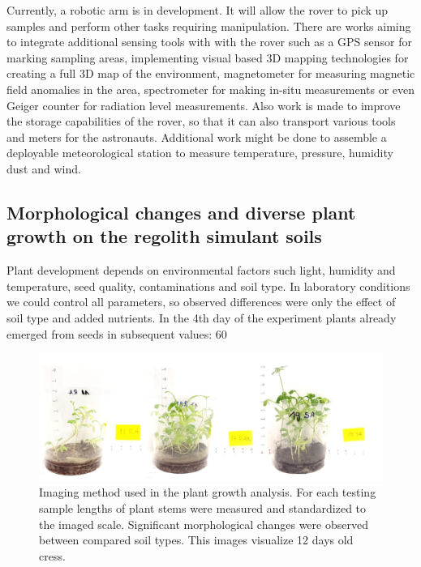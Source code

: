 \documentclass[preprint]{elsarticle}
\begin{document}
Currently, a robotic arm is in development. It will allow the rover to pick up samples and perform other tasks requiring manipulation. There are works aiming to integrate additional sensing tools with with the rover such as a GPS sensor for marking sampling areas, implementing visual based 3D mapping technologies for creating a full 3D map of the environment, magnetometer for measuring magnetic field anomalies in the area, spectrometer for making in-situ measurements or even Geiger counter for radiation level measurements. Also work is made to improve the storage capabilities of the rover, so that it can also transport various tools and meters for the astronauts. Additional work might be done to assemble a deployable meteorological station to measure temperature, pressure, humidity dust and wind.

\subsection{Morphological changes and diverse plant growth on the regolith simulant soils}
Plant development depends on environmental factors such light, humidity and temperature, seed quality, contaminations and soil type. In laboratory conditions we could control all parameters, so observed differences were only the effect of soil type and added nutrients. In the 4th day of the experiment plants already emerged from seeds in subsequent values: 60%

\begin{figure}
\centering
\includegraphics{img/figure10.png}
\caption{Imaging method used in the plant growth analysis. For each testing sample lengths of plant stems were measured and standardized to the imaged scale. Significant morphological changes were observed between compared soil types. This images visualize 12 days old cress.}
\label{fig:f10}
\end{figure}
\end{document}
